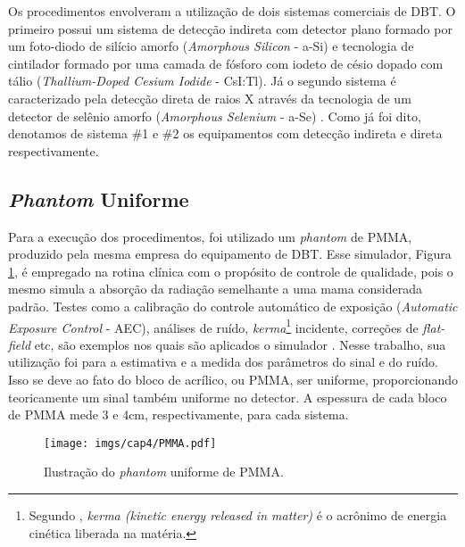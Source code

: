 Os procedimentos envolveram a utilização de dois sistemas comerciais de \acs{DBT}. O primeiro possui um sistema de detecção indireta com detector plano formado por um foto-diodo de silício amorfo (\textit{Amorphous Silicon} - \acs{a-Si}) e tecnologia de cintilador formado por uma camada de fósforo com iodeto de césio dopado com tálio (\textit{Thallium-Doped Cesium Iodide} - \acs{CsI:Tl}). Já o segundo sistema é caracterizado pela detecção direta de raios X através da tecnologia de um detector de selênio amorfo (\textit{Amorphous Selenium} - \acs{a-Se}) \cite[p. 531]{mcEntee2017handbook}. Como já foi dito, denotamos de sistema \#1 e \#2 os equipamentos com detecção indireta e direta respectivamente.

\subsection{\textit{Phantom} Uniforme}

Para a execução dos procedimentos, foi utilizado um \textit{phantom} de \ac{PMMA}, produzido pela mesma empresa do equipamento de \acs{DBT}. Esse simulador, Figura \ref{fig:imgCap4PMMA}, é empregado na rotina clínica com o propósito de controle de qualidade, pois o mesmo simula a absorção da radiação semelhante a uma mama considerada padrão. Testes como a calibração do controle automático de exposição (\textit{Automatic Exposure Control} - \acs{AEC}), análises de ruído, \textit{kerma}\footnote{Segundo , \textit{kerma (kinetic energy released in matter)} é o acrônimo de energia cinética liberada na matéria.} incidente, correções de \textit{flat-field} etc, são exemplos nos quais são aplicados o simulador \cite{caron2017,vanegen2018protocol}. Nesse trabalho, sua utilização foi para a estimativa e a medida dos parâmetros do sinal e do ruído. Isso se deve ao fato do bloco de acrílico, ou \acs{PMMA}, ser uniforme, proporcionando teoricamente um sinal também uniforme no detector. A espessura de cada bloco de \acs{PMMA} mede 3 e 4cm, respectivamente, para cada sistema.

 \begin{figure}[htb]
	\caption{Ilustração do \textit{phantom} uniforme de \acs{PMMA}.}
	\begin{center}
		\texttt{[image: imgs/cap4/PMMA.pdf]}
	\end{center}
	\label{fig:imgCap4PMMA}
\end{figure} 


